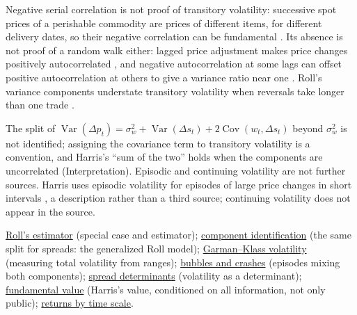 \begin{qfdefinition}
 Negative serial correlation is not proof of transitory volatility: successive spot prices of a perishable commodity are prices of different items, for different delivery dates, so their negative correlation can be fundamental \citep[chap.~``Volatility'', box, p.~413]{alpha-harris}. Its absence is not proof of a random walk either: lagged price adjustment makes price changes positively autocorrelated \citep[sec.~8.6, Exercise~8.2, p.~74]{s6-hasbrouck}, and negative autocorrelation at some lags can offset positive autocorrelation at others to give a variance ratio near one \citep[sec.~8.7, p.~75]{s6-hasbrouck}. Roll's variance components understate transitory volatility when reversals take longer than one trade \citep[chap.~``Volatility'', p.~416]{alpha-harris}.

The split of $\operatorname{Var}(\Delta p_t)=\sigma_w^2+\operatorname{Var}(\Delta s_t)+2\operatorname{Cov}(w_t,\Delta s_t)$ beyond $\sigma_w^2$ is not identified; assigning the covariance term to transitory volatility is a convention, and Harris's ``sum of the two'' holds when the components are uncorrelated (Interpretation). Episodic and continuing volatility are not further sources. Harris uses episodic volatility for episodes of large price changes in short intervals \citep[same chap., p.~410]{alpha-harris}, a description rather than a third source; continuing volatility does not appear in the source.

 \hyperref[res:roll-spread-estimator]{Roll's estimator} (special case and estimator); \hyperref[res:spread-component-identification]{component identification} (the same split for spreads: the generalized Roll model); \hyperref[meth:garman-klass-volatility]{Garman--Klass volatility} (measuring total volatility from ranges); \hyperref[mech:bubble-crash-dynamics]{bubbles and crashes} (episodes mixing both components); \hyperref[res:spread-determinants]{spread determinants} (volatility as a determinant); \hyperref[def:fundamental-value]{fundamental value} (Harris's value, conditioned on all information, not only public); \hyperref[def:intraday-overnight-returns]{returns by time scale}.

\end{qfdefinition}

